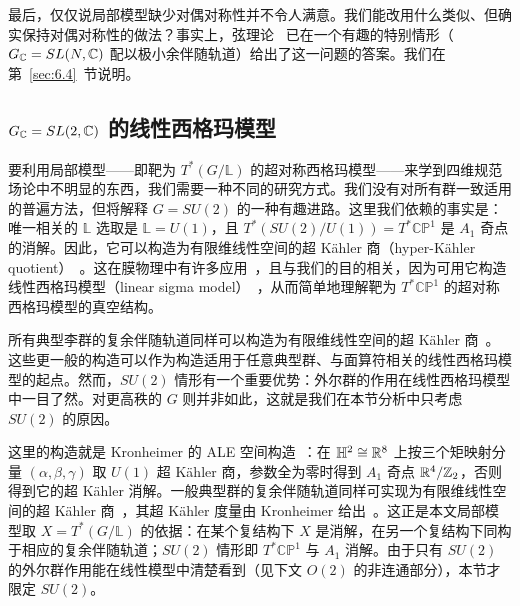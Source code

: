 最后，仅仅说局部模型缺少对偶对称性并不令人满意。我们能改用什么类似、但确实保持对偶对称性的做法？事实上，弦理论~\cite{ref18} 已在一个有趣的特别情形（$G_{\mathbb{C}}=SL(N,{\mathbb{C}})$ 配以极小余伴随轨道）给出了这一问题的答案。我们在第~\ref{sec:6.4}~节说明。

\subsection{\texorpdfstring{$G_{\mathbb{C}}=SL(2,{\mathbb{C}})$ 的线性西格玛模型}{G_C = SL(2,C) 的线性西格玛模型}}
\label{sec:6.2}

要利用局部模型——即靶为 $T^*(G/\mathbb{L})$ 的超对称西格玛模型——来学到四维规范场论中不明显的东西，我们需要一种不同的研究方式。我们没有对所有群一致适用的普遍方法，但将解释 $G=SU(2)$ 的一种有趣进路。这里我们依赖的事实是：唯一相关的 $\mathbb{L}$ 选取是 $\mathbb{L}=U(1)$，且 $T^*(SU(2)/U(1))=T^*\mathbb{CP}^1$ 是 $A_1$ 奇点的消解。因此，它可以构造为有限维线性空间的超 Kähler 商（hyper-Kähler quotient）~\cite{ref62}。这在膜物理中有许多应用~\cite{ref80}，且与我们的目的相关，因为可用它构造线性西格玛模型（linear sigma model）~\cite{ref81}，从而简单地理解靶为 $T^*\mathbb{CP}^1$ 的超对称西格玛模型的真空结构。

所有典型李群的复余伴随轨道同样可以构造为有限维线性空间的超 Kähler 商~\cite{ref82}。这些更一般的构造可以作为构造适用于任意典型群、与面算符相关的线性西格玛模型的起点。然而，$SU(2)$ 情形有一个重要优势：外尔群的作用在线性西格玛模型中一目了然。对更高秩的 $G$ 则并非如此，这就是我们在本节分析中只考虑 $SU(2)$ 的原因。

\begin{yizhu}[物理图像补充]这里的构造就是 Kronheimer 的 ALE 空间构造~\cite{ref62}：在 $\mathbb{H}^2\cong{\mathbb{R}}^8$ 上按三个矩映射分量 $(\alpha,\beta,\gamma)$ 取 $U(1)$ 超 Kähler 商，参数全为零时得到 $A_1$ 奇点 ${\mathbb{R}}^4/{\mathbb{Z}}_2$，否则得到它的超 Kähler 消解。一般典型群的复余伴随轨道同样可实现为有限维线性空间的超 Kähler 商~\cite{ref82}，其超 Kähler 度量由 Kronheimer 给出~\cite{ref34}。这正是本文局部模型取 $X=T^*(G/\mathbb{L})$ 的依据：在某个复结构下 $X$ 是消解，在另一个复结构下同构于相应的复余伴随轨道；$SU(2)$ 情形即 $T^*\mathbb{CP}^1$ 与 $A_1$ 消解。由于只有 $SU(2)$ 的外尔群作用能在线性模型中清楚看到（见下文 $O(2)$ 的非连通部分），本节才限定 $SU(2)$。\end{yizhu}

